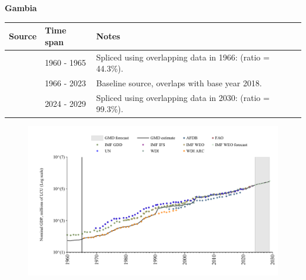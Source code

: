 \documentclass[12pt,a4paper,landscape]{article}
\begin{document}
\begin{adjustbox}{max totalsize={\paperwidth}{\paperheight},center}
\begin{minipage}[t][\textheight][t]{\textwidth}
\vspace*{0.5cm}
{}
\begin{center}
{\Large\bfseries Gambia}
\end{center}
\vspace{0.5cm}
\begin{table}[H]
\centering
\small
\begin{tabular}{|l|l|l|}
\hline
\textbf{Source} & \textbf{Time span} & \textbf{Notes} \\
\hline
\rowcolor{white}\cite{IMF_GDD}& 1960 - 1965 &Spliced using overlapping data in 1966: (ratio = 44.3\%).\\
\rowcolor{lightgray}\cite{WDI}& 1966 - 2023 &Baseline source, overlaps with base year 2018.\\
\rowcolor{white}\cite{IMF_WEO_forecast}& 2024 - 2029 &Spliced using overlapping data in 2030: (ratio = 99.3\%).\\
\hline
\end{tabular}
\end{table}
\begin{figure}[H]
\centering
\includegraphics[width=\textwidth,height=0.6\textheight,keepaspectratio]{graphs/GMB_nGDP.pdf}
\end{figure}
\end{minipage}
\end{adjustbox}
\end{document}
